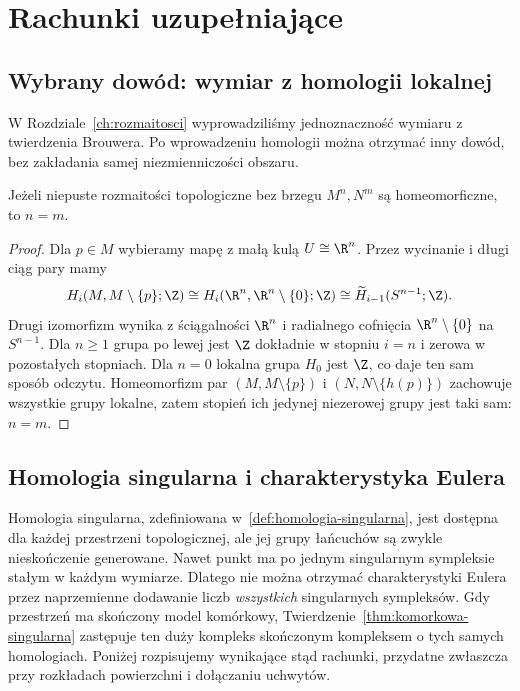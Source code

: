 \chapter{Rachunki uzupełniające}
\label{app:homologia-singularna-euler}

\section{Wybrany dowód: wymiar z homologii lokalnej}
\label{sec:local-dimension-appendix}

W Rozdziale~\ref{ch:rozmaitosci}
wyprowadziliśmy jednoznaczność
wymiaru z twierdzenia Brouwera.
Po wprowadzeniu homologii
można otrzymać inny dowód,
bez zakładania samej
niezmienniczości obszaru.

\begin{stwierdzenie}
\label{prop:dimension-local-homology}
Jeżeli niepuste rozmaitości
topologiczne bez brzegu
$M^n,N^m$ są homeomorficzne,
to $n=m$.
\end{stwierdzenie}
\begin{proof}
Dla $p\in M$ wybieramy
mapę z małą kulą
$U\cong\R^n$. Przez
wycinanie i długi ciąg
pary mamy
\[
 H_i(M,M\setminus\{p\};\Z)
 \cong H_i(\R^n,\R^n\setminus\{0\};\Z)
 \cong\widetilde H_{i-1}(S^{n-1};\Z).
\]
Drugi izomorfizm wynika z
ściągalności $\R^n$
i radialnego cofnięcia
$\R^n\setminus\{0\}$
na $S^{n-1}$.
Dla $n\geq1$ grupa
po lewej jest $\Z$
dokładnie w stopniu $i=n$
i zerowa w pozostałych
stopniach. Dla $n=0$
lokalna grupa $H_0$
jest $\Z$, co daje
ten sam sposób odczytu.
Homeomorfizm par
$(M,M\setminus\{p\})$
i $(N,N\setminus\{h(p)\})$
zachowuje wszystkie
grupy lokalne, zatem
stopień ich jedynej
niezerowej grupy jest
taki sam: $n=m$.
\end{proof}


\section{Homologia singularna i charakterystyka Eulera}

Homologia singularna, zdefiniowana w~\ref{def:homologia-singularna},
jest dostępna dla każdej przestrzeni topologicznej, ale jej grupy
łańcuchów są zwykle nieskończenie generowane. Nawet punkt ma po jednym
singularnym sympleksie stałym w każdym wymiarze. Dlatego nie można
otrzymać charakterystyki Eulera przez naprzemienne dodawanie liczb
\emph{wszystkich} singularnych sympleksów. Gdy przestrzeń ma skończony
model komórkowy, Twierdzenie~\ref{thm:komorkowa-singularna} zastępuje
ten duży kompleks skończonym kompleksem o tych samych homologiach.
Poniżej rozpisujemy wynikające stąd rachunki, przydatne zwłaszcza
przy rozkładach powierzchni i dołączaniu uchwytów.

